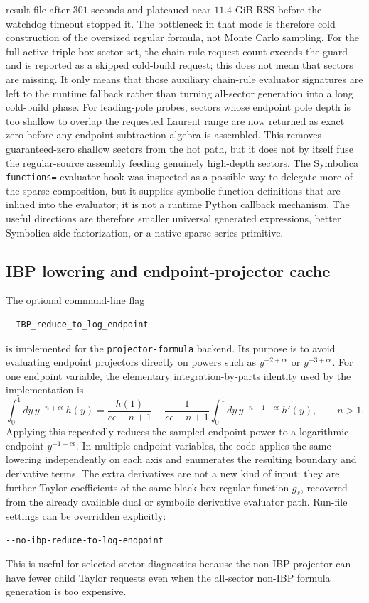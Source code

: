 \documentclass[11pt]{article}
\newcommand{\eps}{\epsilon}
\begin{document}
result file after \(301\) seconds and plateaued near \(11.4\) GiB RSS before
the watchdog timeout stopped it.  The bottleneck in that mode is therefore
cold construction of the oversized regular formula, not Monte Carlo sampling.
For the full active triple-box sector set, the chain-rule request count exceeds
the guard and is reported as a skipped cold-build request; this does not mean
that sectors are missing.  It only means that those auxiliary chain-rule
evaluator signatures are left to the runtime fallback rather than turning
all-sector generation into a long cold-build phase.
For leading-pole probes, sectors whose endpoint pole depth is too shallow to
overlap the requested Laurent range are now returned as exact zero before any
endpoint-subtraction algebra is assembled.  This removes guaranteed-zero
shallow sectors from the hot path, but it does not by itself fuse the
regular-source assembly feeding genuinely high-depth sectors.
The Symbolica \texttt{functions=} evaluator hook was inspected as a possible
way to delegate more of the sparse composition, but it supplies symbolic
function definitions that are inlined into the evaluator; it is not a runtime
Python callback mechanism.  The useful directions are therefore smaller
universal generated expressions, better Symbolica-side factorization, or a
native sparse-series primitive.

\subsection{IBP lowering and endpoint-projector cache}

The optional command-line flag
\begin{lstlisting}[style=fsdcode]
--IBP_reduce_to_log_endpoint
\end{lstlisting}
is implemented for the \texttt{projector-formula} backend.  Its purpose is to
avoid evaluating endpoint projectors directly on powers such as
\(y^{-2+c\eps}\) or \(y^{-3+c\eps}\).  For one endpoint variable, the
elementary integration-by-parts identity used by the implementation is
\begin{equation}
  \int_0^1 dy\, y^{-n+c\eps}\,h(y)
  =
  \frac{h(1)}{c\eps-n+1}
  -
  \frac{1}{c\eps-n+1}
  \int_0^1 dy\,y^{-n+1+c\eps}\,h'(y),
  \qquad n>1 .
\end{equation}
Applying this repeatedly reduces the sampled endpoint power to a logarithmic
endpoint \(y^{-1+c\eps}\).  In multiple endpoint variables, the code applies
the same lowering independently on each axis and enumerates the resulting
boundary and derivative terms.  The extra derivatives are not a new kind of
input: they are further Taylor coefficients of the same black-box regular
function \(g_s\), recovered from the already available dual or symbolic
derivative evaluator path.
Run-file settings can be overridden explicitly:
\begin{lstlisting}[style=fsdcode]
--no-ibp-reduce-to-log-endpoint
\end{lstlisting}
This is useful for selected-sector diagnostics because the non-IBP projector
can have fewer child Taylor requests even when the all-sector non-IBP formula
generation is too expensive.
\end{document}

